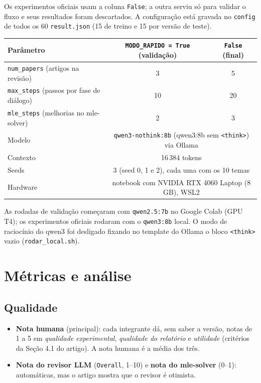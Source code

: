 \documentclass[11pt,a4paper]{article}
\begin{document}
Os experimentos oficiais usam a coluna \texttt{False}; a outra serviu só para validar o fluxo
e seus resultados foram descartados. A configuração está gravada no \texttt{config} de todos os
60 \texttt{result.json} (15 de treino e 15 por versão de teste).

\begin{center}
\begin{tabular}{lcc}
\toprule
Parâmetro & \texttt{MODO\_RAPIDO = True} (validação) & \texttt{False} (final) \\
\midrule
\texttt{num\_papers} (artigos na revisão) & 3 & 5 \\
\texttt{max\_steps} (passos por fase de diálogo) & 10 & 20 \\
\texttt{mle\_steps} (melhorias no mle-solver) & 2 & 3 \\
\midrule
Modelo & \multicolumn{2}{c}{\texttt{qwen3-nothink:8b} (qwen3:8b sem \texttt{<think>}) via Ollama} \\
Contexto & \multicolumn{2}{c}{16\,384 tokens} \\
Seeds & \multicolumn{2}{c}{3 (seed 0, 1 e 2), cada uma com os 10 temas} \\
Hardware & \multicolumn{2}{c}{notebook com NVIDIA RTX 4060 Laptop (8 GB), WSL2} \\
\bottomrule
\end{tabular}
\end{center}

As rodadas de validação começaram com \texttt{qwen2.5:7b} no Google Colab (GPU T4); os
experimentos oficiais rodaram com o \texttt{qwen3:8b} local. %
O modo de raciocínio do qwen3 foi desligado fixando no template do Ollama o bloco
\texttt{<think>} vazio (\texttt{rodar\_local.sh}). %

\section{Métricas e análise}

\subsection{Qualidade}

\begin{itemize}
  \item \textbf{Nota humana} (principal): cada integrante dá, sem saber a versão, notas de 1 a 5 em
        \emph{qualidade experimental}, \emph{qualidade do relatório} e \emph{utilidade}
        (critérios da Seção 4.1 do artigo). A nota humana é a média dos três.
  \item \textbf{Nota do revisor LLM} (\texttt{Overall}, 1--10) e \textbf{nota do mle-solver} (0--1):
        automáticas, mas o artigo mostra que o revisor é otimista.
\end{itemize}
\end{document}
